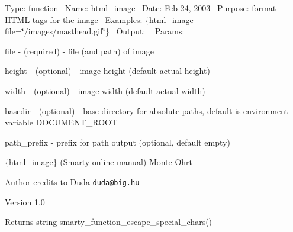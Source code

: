 Type\+: function~\newline
 Name\+: html\+\_\+image~\newline
 Date\+: Feb 24, 2003~\newline
 Purpose\+: format H\+T\+M\+L tags for the image~\newline
 Examples\+: \{html\+\_\+image file=\char`\"{}/images/masthead.\+gif\char`\"{}\}~\newline
 Output\+: ~\newline
 Params\+: 
\begin{DoxyPre}
\begin{DoxyItemize}
\item file        - (required) - file (and path) of image
\item height      - (optional) - image height (default actual height)
\item width       - (optional) - image width (default actual width)
\item basedir     - (optional) - base directory for absolute paths, default is environment variable DOCUMENT\_ROOT
\item path\_prefix - prefix for path output (optional, default empty)

\end{DoxyItemize}\end{DoxyPre}



\begin{DoxyPre}\hyperlink{}{\{html\_image\}
     (Smarty online manual)
 Monte Ohrt } 
\begin{DoxyAuthor}{Author}
credits to Duda \href{mailto:duda@big.hu}{\tt duda@big.hu} 

\end{DoxyAuthor}
\begin{DoxyVersion}{Version}
1.0

\end{DoxyVersion}

\begin{DoxyReturn}{Returns}
string 
 smarty\_function\_escape\_special\_chars()

\end{DoxyReturn}
\end{DoxyPre}
